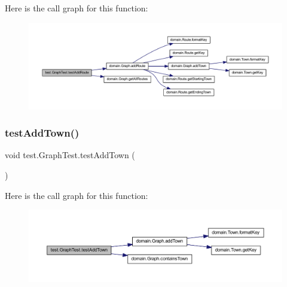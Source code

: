 Here is the call graph for this function\+:\nopagebreak
\begin{figure}[H]
\begin{center}
\leavevmode
\includegraphics[width=350pt]{classtest_1_1_graph_test_ab7eeb2aca803777eafaca3a6da72ab9e_cgraph}
\end{center}
\end{figure}
\mbox{\label{classtest_1_1_graph_test_a473c660cf4912cd95c878c538b99de05}} 
\subsubsection{\texorpdfstring{test\+Add\+Town()}{testAddTown()}}
{\footnotesize\ttfamily void test.\+Graph\+Test.\+test\+Add\+Town (\begin{DoxyParamCaption}{ }\end{DoxyParamCaption})}

Here is the call graph for this function\+:\nopagebreak
\begin{figure}[H]
\begin{center}
\leavevmode
\includegraphics[width=350pt]{classtest_1_1_graph_test_a473c660cf4912cd95c878c538b99de05_cgraph}
\end{center}
\end{figure}
\mbox{\label{classtest_1_1_graph_test_a58d63fd09c3102ebb1e07b88fd588831}} 
